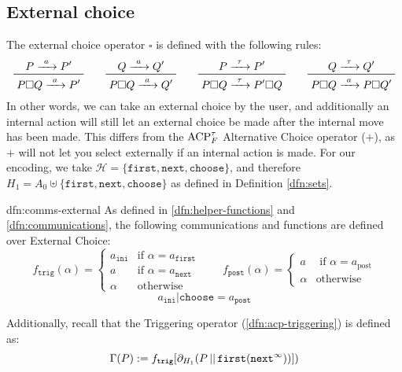 \documentclass[../hons_project.tex]{subfiles}
\begin{document}
\subsection{External choice}\label{ssec:external-choice}


The external choice operator $\square$ is defined with the following rules:
\begin{equation}\label{eq:csp-definition}
	\prftree{P \prightarrow{a} P'}{P \square Q \prightarrow{a} P'} \qquad \prftree{Q \prightarrow{a} Q'}{P \square Q \prightarrow{a} Q'} \qquad \prftree{P \prightarrow{\tau} P'}{P \square Q \prightarrow{\tau} P' \square Q} \qquad \prftree{Q \prightarrow{\tau} Q'}{P \square Q \prightarrow{a} P \square Q'}
\end{equation}
In other words, we can take an external choice by the user, and additionally an internal action will still let an external choice be made after the internal move has been made. This differs from the $\acptf$ Alternative Choice operator ($+$), as $+$ will not let you select externally if an internal action is made. For our encoding, we take $\mathscr{H} = \{\mathtt{first}, \mathtt{next}, \mathtt{choose}\}$, and therefore $H_{1} = A_{0} \uplus \{\mathtt{first}, \mathtt{next}, \mathtt{choose}\}$ as defined in Definition \ref{dfn:sets}.

\begin{dfn}{dfn:comms-external}{}
	As defined in \ref{dfn:helper-functions} and \ref{dfn:communications}, the following communications and functions are defined over External Choice:
	\[f_{\mathtt{trig}}(\alpha) = \begin{cases}
			a_{\mathtt{ini}} & \text{if } \alpha = a_{\mathtt{first}} \\
			a                & \text{if } \alpha = a_{\mathtt{next}}  \\
			\alpha           & \text{otherwise}
		\end{cases} \qquad f_{\mathtt{post}}(\alpha) = \begin{cases}
			a      & \text{ if } \alpha = a_{\mathrm{post}} \\
			\alpha & \text{otherwise}
		\end{cases}
	\]
	\[
		a_{\mathtt{ini}} | \mathtt{choose} = a_{\mathtt{post}}
	\]
	\longrule{0.08ex}

	Additionally, recall that the Triggering operator (\ref{dfn:acp-triggering}) is defined as:
	\[\Gamma(P) := f_{\mathtt{trig}}[\partial_{H_{1}}(P \merge \mathtt{first}(\mathtt{next}^{\infty}))])\]
\end{dfn}
\end{document}
